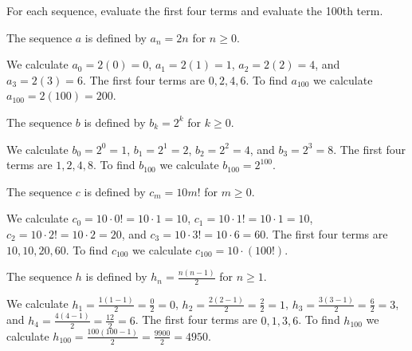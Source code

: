 \begin{exam}
\label{exam_eval_seq}
    For each sequence, evaluate the first four terms and evaluate the 100th term.
        \begin{apart}
            \item \label{part_eval_seq_linear} The sequence $a$ is defined by $a_n= 2n$ for $n \ge 0$. 
                \begin{soln}
                    We calculate 
                    $a_0 = 2(0) = 0$, 
                    $a_1 = 2(1) = 1$, 
                    $a_2 = 2(2) = 4$, and 
                    $a_3 = 2(3) = 6$.  The first four terms are  $0, 2, 4, 6$. To find $a_{100}$ we calculate 
                    $a_{100}= 2(100) = 200.$ 
                \end{soln} 

            \item \label{part_eval_seq_exponential} The sequence $b$ is defined by $b_k = 2^k$ for $k \ge 0$.
                \begin{soln}
                    We calculate 
                    $b_0 = 2^0 = 1$, 
                    $b_1 = 2^1 = 2$, 
                    $b_2 = 2^2 = 4$, and 
                    $b_3 = 2^3 = 8$.  The first four terms are  $1,2,4,8$. To find $b_{100}$ we calculate 
                    $b_{100}= 2^{100}.$
                \end{soln} 

            \item \label{part_eval_seq_factorial} The sequence $c$ is defined by $c_m = 10m!$ for $m \ge 0$.
                \begin{soln}
                    We calculate 
                    $c_0 = 10\cdot0! = 10\cdot1= 10$, 
                    $c_1 = 10\cdot1! = 10\cdot1= 10$, 
                    $c_2 = 10\cdot2! = 10\cdot2= 20$, and 
                    $c_3 = 10\cdot3! = 10\cdot6= 60$.  The first four terms are  $10, 10, 20, 60$. To find $c_{100}$ we calculate 
                    $c_{100}= 10\cdot(100!).$ 
                \end{soln}

            \item \label{part_eval_seq_hs} The sequence $h$ is defined by $h_n = \frac{n(n-1)}{2}$ for $n \ge 1$.
                \begin{soln}
                    We calculate 
                    $h_1 = \frac{1(1-1)}{2}= \frac{0}{2} = 0$, 
                    $h_2 = \frac{2(2-1)}{2}= \frac{2}{2} = 1$, 
                    $h_3 = \frac{3(3-1)}{2}= \frac{6}{2} = 3$, and 
                    $h_4 = \frac{4(4-1)}{2}= \frac{12}{2} = 6$.  The first four terms are  $0,1,3,6$. To find $h_{100}$ we calculate 
                    $h_{100}=\frac{100(100-1)}{2}= \frac{9900}{2} = 4950$. 
                \end{soln}


\end{apart}
\end{exam}
